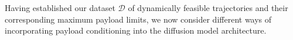 Having established our dataset $\mathcal{D}$ of dynamically feasible trajectories and their corresponding maximum payload limits, we now consider different ways of incorporating payload conditioning into the diffusion model architecture.

